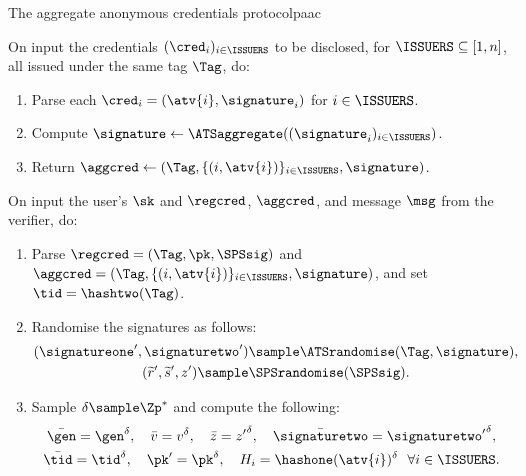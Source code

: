 \begin{protocolbox}{The aggregate anonymous credentials protocol}{paac}
\begin{description}
\begin{enumerate}
      \end{enumerate}

    \item[$\aggcred \leftarrow \AACaggregate(\crs,(\cred_i)_{i \in \ISSUERS})$ :]
On input the credentials $(\cred_i)_{i \in \ISSUERS}$ to be disclosed, for
$\ISSUERS \subseteq [1,n]$, all issued under the same tag $\Tag$, do:

      \begin{enumerate}

	\item Parse each $\cred_i = (\atv{i},\signature_i)$ for $i \in \ISSUERS$.

	\item Compute $\signature \leftarrow
\ATSaggregate((\signature_i)_{i\in\ISSUERS})$.

	\item Return $\aggcred \leftarrow
(\Tag,\{(i, \atv{i})\}_{i\in\ISSUERS},\signature)$.

      \end{enumerate}

    \item[$\algoproof \sample \AACpresent(\crs,\sk,\regcred,\aggcred,\msg)$ :]
On input the user's $\sk$ and $\regcred$, $\aggcred$, and message $\msg$
from the verifier, do:

      \begin{enumerate}

	\item Parse $\regcred = (\Tag,\pk,\SPSsig)$ and $\aggcred =
(\Tag,\{(i, \atv{i})\}_{i \in \ISSUERS},\signature)$, and set $\tid =
\hashtwo(\Tag)$.

	\item Randomise the signatures as follows:
	  \begin{gather*}
	    (\signatureone', \signaturetwo') \sample
\ATSrandomise(\Tag,\signature), \\ (\widetilde{r}', \widetilde{s}', z')
\sample \SPSrandomise(\SPSsig).
	  \end{gather*}

	\item Sample $\delta \sample \Zp^*$ and compute the following:
	  \begin{gather*}
	    \bar{\gen} = \gen^\delta, \quad \bar{v} = v^\delta, \quad \bar{z} =
{z'}^\delta, \quad \bar{\signaturetwo} = {\signaturetwo'}^\delta, \\
\bar{\tid} = \tid^\delta, \quad \pk' = \pk^\delta, \quad H_i =
\hashone(\atv{i})^\delta \ \ \forall i \in \ISSUERS.
	  \end{gather*}


\end{enumerate}
\end{description}
\end{protocolbox}
